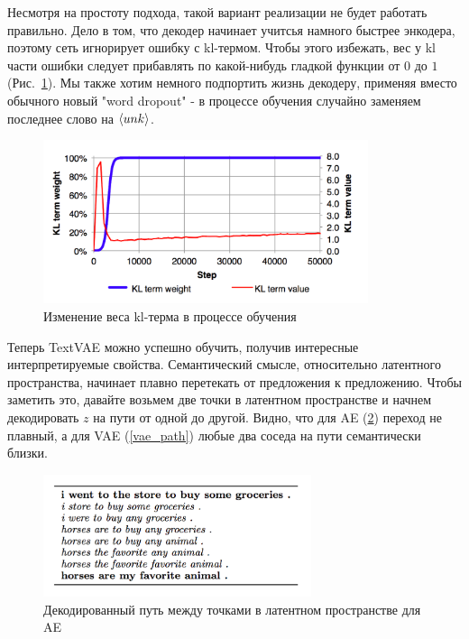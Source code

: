 \documentclass{spbau-diploma}
\begin{document}
Несмотря на простоту подхода, такой вариант реализации не будет работать 
правильно. Дело в том, что декодер начинает учитсья намного быстрее энкодера,
поэтому сеть игнорирует ошибку с kl-термом. Чтобы этого избежать, вес у kl части 
ошибки следует прибавлять по какой-нибудь гладкой функции от $0$ до $1$ 
(Рис.~\ref{kl_term_w}). Мы также хотим немного подпортить жизнь декодеру, 
применяя вместо обычного новый "word dropout" - в процессе обучения случайно 
заменяем последнее слово на $\langle unk \rangle$.

\begin{figure}[h]
\centering
\includegraphics[width=0.85\textwidth]{images/kl_term_w.png}
\caption{Изменение веса kl-терма в процессе обучения}
\label{kl_term_w}
\end{figure}

Теперь TextVAE можно успешно обучить, получив интересные интерпретируемые 
свойства. Семантический смысле, относительно латентного 
пространства, начинает плавно перетекать от предложения к предложению. Чтобы 
заметить это, давайте возьмем две точки в латентном пространстве и начнем 
декодировать $z$ на пути от одной до другой. Видно, что для AE 
(\ref{ae_path}) переход не плавный, а для VAE (\ref{vae_path}) любые два соседа
на пути семантически близки.

\begin{figure}[h]
\centering
\includegraphics[width=0.7\textwidth]{images/ae_path.png}
\caption{Декодированный путь между точками в латентном пространстве для AE}
\label{ae_path}
\end{figure}
\end{document}
